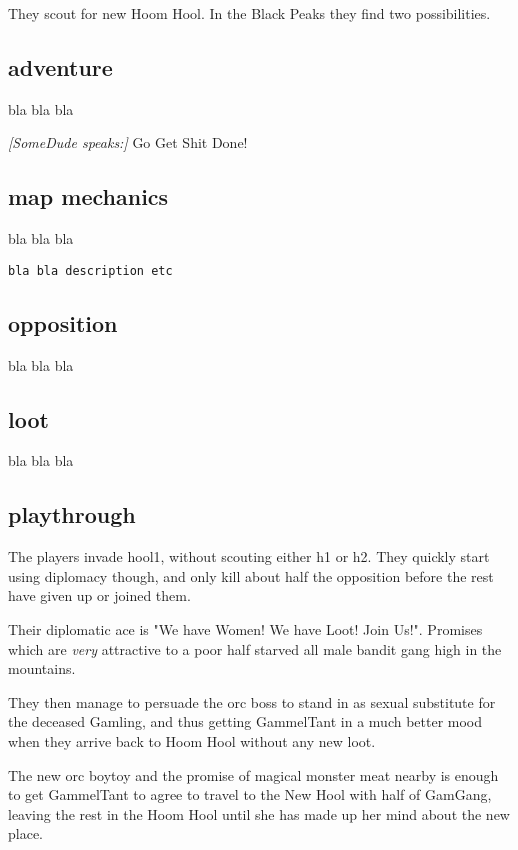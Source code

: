 They scout for new Hoom Hool. In the Black Peaks they find two possibilities.


\subsection*{adventure}

bla bla bla

\begin{readoutloud}
\emph{[SomeDude speaks:]}
Go Get Shit Done!
\end{readoutloud}


\subsection*{map mechanics}

bla bla bla

\small \begin{verbatim}
bla bla description etc
\end{verbatim} \normalsize


\subsection*{opposition}

bla bla bla


\subsection*{loot}

bla bla bla


\subsection*{playthrough}

The players invade hool1, without scouting either h1 or h2. They quickly start using diplomacy though, and only kill about half the opposition before the rest have given up or joined them.

Their diplomatic ace is "We have Women! We have Loot! Join Us!". Promises which are \emph{very} attractive to a poor half starved all male bandit gang high in the mountains.

They then manage to persuade the orc boss to stand in as sexual substitute for the deceased Gamling, and thus getting GammelTant in a much better mood when they arrive back to Hoom Hool without any new loot.

The new orc boytoy and the promise of magical monster meat nearby is enough to get GammelTant to agree to travel to the New Hool with half of GamGang, leaving the rest in the Hoom Hool until she has made up her mind about the new place.

